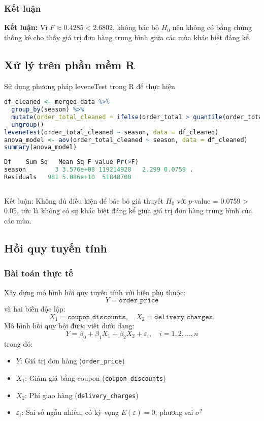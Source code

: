 \subsubsection{Kết luận}
\begin{boxH}

\textbf{Kết luận:} 
Vì $F \approx 0.4285 < 2.6802$, không bác bỏ $H_0$ nên không có bằng chứng thống kê cho thấy giá trị đơn hàng trung bình giữa các mùa khác biệt đáng kể.

\end{boxH}

\subsection{Xử lý trên phần mềm R}
Sử dụng phương pháp leveneTest trong R để thực hiện
\begin{lstlisting}[language=R, caption=Phép kiểm ANOVA một yếu tố]
df_cleaned <- merged_data %>%
  group_by(season) %>%
  mutate(order_total_cleaned = ifelse(order_total > quantile(order_total, 0.75) + 1.5 * IQR(order_total) | order_total < quantile(order_total, 0.25) - 1.5 * IQR(order_total), NA, order_total)) %>%
  ungroup()
leveneTest(order_total_cleaned ~ season, data = df_cleaned)
anova_model <- aov(order_total_cleaned ~ season, data = df_cleaned)
summary(anova_model)
\end{lstlisting}

\begin{lstlisting}[language=R, caption=Kết quả ANOVA một yếu tố]
Df    Sum Sq   Mean Sq F value Pr(>F)  
season        3 3.576e+08 119214928   2.299 0.0759 .
Residuals   981 5.086e+10  51848700 
  
\end{lstlisting}
Kết luận: Không đủ điều kiện để bác bỏ giả thuyết $H_0$ với $p$-value = 0.0759 > 0.05, tức là không có sự khác biệt đáng kể giữa giá trị đơn hàng trung bình của các mùa.
\subsection{Hồi quy tuyến tính}

\subsubsection{Bài toán thực tế}
Xây dựng mô hình hồi quy tuyến tính với biến phụ thuộc:
\[
Y = \texttt{order\_price}
\]
và hai biến độc lập:
\[
X_1 = \texttt{coupon\_discounts}, \quad X_2 = \texttt{delivery\_charges}.
\]
Mô hình hồi quy bội được viết dưới dạng:
\[
Y = \beta_0 + \beta_1 X_1 + \beta_2 X_2 + \varepsilon_i, \quad i = 1, 2, \ldots, n
\]
trong đó:
\begin{itemize}
    \item $Y$: Giá trị đơn hàng (\texttt{order\_price})
    \item $X_1$: Giảm giá bằng coupon (\texttt{coupon\_discounts})
    \item $X_2$: Phí giao hàng (\texttt{delivery\_charges})
    \item $\varepsilon_i$: Sai số ngẫu nhiên, có kỳ vọng $E(\varepsilon) = 0$, phương sai $\sigma^2$
\end{itemize}

